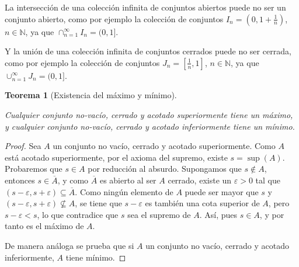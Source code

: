 \documentclass[
  a4paper,
]{scrreport}
\theoremstyle{definition}
\theoremstyle{plain}
\theoremstyle{definition}
\theoremstyle{definition}
\theoremstyle{plain}
\newtheorem{theorem}{Teorema}[chapter]
\theoremstyle{plain}
\theoremstyle{remark}
\begin{document}
\begin{tcolorbox}[enhanced jigsaw, leftrule=.75mm, colbacktitle=quarto-callout-warning-color!10!white, toprule=.15mm, opacityback=0, opacitybacktitle=0.6, toptitle=1mm, breakable, bottomtitle=1mm, colframe=quarto-callout-warning-color-frame, rightrule=.15mm, titlerule=0mm, title=\textcolor{quarto-callout-warning-color}{\faExclamationTriangle}\hspace{0.5em}{Advertencia}, arc=.35mm, left=2mm, bottomrule=.15mm, colback=white, coltitle=black]

La intersección de una colección infinita de conjuntos abiertos puede no
ser un conjunto abierto, como por ejemplo la colección de conjuntos
\(I_n=(0,1+\frac{1}{n})\), \(n\in\mathbb{N}\), ya que
\(\cap_{n=1}^\infty I_n=(0,1]\).

Y la unión de una colección infinita de conjuntos cerrados puede no ser
cerrada, como por ejemplo la colección de conjuntos
\(J_n=[\frac{1}{n},1]\), \(n\in\mathbb{N}\), ya que
\(\cup_{n=1}^\infty J_n=(0,1]\).

\end{tcolorbox}

\begin{theorem}[Existencia del máximo y
mínimo]\protect\hypertarget{thm-existencia-maximo-minimo}{}\label{thm-existencia-maximo-minimo}

Cualquier conjunto no-vacío, cerrado y acotado superiormente tiene un
máximo, y cualquier conjunto no-vacío, cerrado y acotado inferiormente
tiene un mínimo.

\end{theorem}

\begin{tcolorbox}[enhanced jigsaw, leftrule=.75mm, colbacktitle=quarto-callout-note-color!10!white, toprule=.15mm, opacityback=0, opacitybacktitle=0.6, toptitle=1mm, breakable, bottomtitle=1mm, colframe=quarto-callout-note-color-frame, rightrule=.15mm, titlerule=0mm, title=\textcolor{quarto-callout-note-color}{\faInfo}\hspace{0.5em}{Demostración}, arc=.35mm, left=2mm, bottomrule=.15mm, colback=white, coltitle=black]

\begin{proof}
Sea \(A\) un conjunto no vacío, cerrado y acotado superiormente. Como
\(A\) está acotado superiormente, por el axioma del supremo, existe
\(s=\sup(A)\). Probaremos que \(s\in A\) por reducción al absurdo.
Supongamos que \(s\not\in A\), entonces \(s\in\overline{A}\), y como
\(\overline{A}\) es abierto al ser \(A\) cerrado, existe un
\(\varepsilon>0\) tal que
\((s-\varepsilon, s+\varepsilon)\subseteq \overline{A}\). Como ningún
elemento de \(A\) puede ser mayor que \(s\) y
\((s-\varepsilon, s+\varepsilon)\not\subseteq A\), se tiene que
\(s-\varepsilon\) es también una cota superior de \(A\), pero
\(s-\varepsilon <s\), lo que contradice que \(s\) sea el supremo de
\(A\). Así, pues \(s\in A\), y por tanto es el máximo de \(A\).

De manera análoga se prueba que si \(A\) un conjunto no vacío, cerrado y
acotado inferiormente, \(A\) tiene mínimo.
\end{proof}

\end{tcolorbox}
\end{document}
